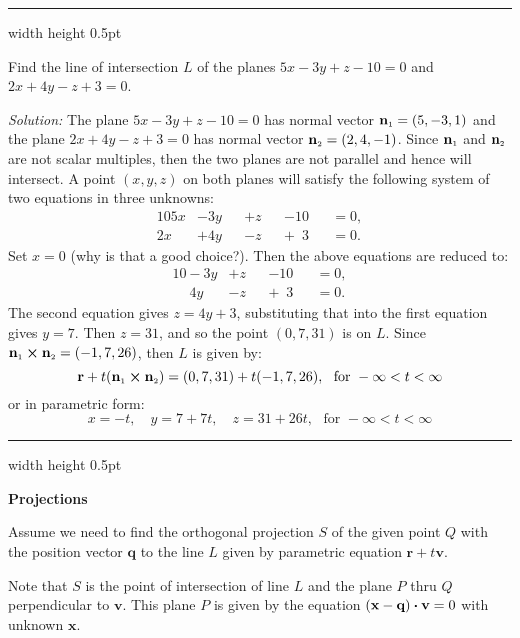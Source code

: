 \medskip
\hrule width \textwidth height 0.5pt
\begin{exmp}\label{exmp:planeinter}
 Find the line of intersection $L$ of the planes $5x - 3y + z - 10 = 0$ and $2x + 4y - z + 3 = 0$.
 \smallskip
 \par\noindent\emph{Solution:} The plane $5x - 3y + z - 10 = 0$ has normal vector $\textbf{n}_{\scriptscriptstyle 1} = (5,-3,1)$ and
 the plane $2x + 4y - z + 3 = 0$ has normal vector $\textbf{n}_{\scriptscriptstyle 2} = (2,4,-1)$. Since $\textbf{n}_{\scriptscriptstyle 1}$ and
 $\textbf{n}_{\scriptscriptstyle 2}$ are not scalar multiples, then the two planes are not parallel and hence will intersect. A
 point $(x,y,z)$ on both planes will satisfy the following system of two equations in three unknowns:
 \begin{alignat*}{10}
  5x &- 3y &&+ z &&- 10 &&= 0,\\
  2x &+ 4y &&- z &&+ \phantom{1}3 &&= 0.
 \end{alignat*}
 Set $x = 0$ (why is that a good choice?). Then the above equations are reduced to:
 \begin{alignat*}{10}
  -3y &+ z &&- 10 &&= 0,\\
  \phantom{-}4y &- z &&+ \phantom{1}3 &&= 0.
 \end{alignat*}
 The second equation gives $z = 4y + 3$, substituting that into the first equation gives $y = 7$. Then $z = 31$,
 and so the point $(0,7,31)$ is on $L$. Since $\textbf{n}_{\scriptscriptstyle 1} \bm{\times} \textbf{n}_{\scriptscriptstyle 2} = (-1,7,26)$,
 then $L$ is given by:
 \begin{displaymath}
  \textbf{r} + t(\textbf{n}_{\scriptscriptstyle 1} \bm{\times} \textbf{n}_{\scriptscriptstyle 2}) = (0,7,31) + t(-1,7,26), \text{~~for~}
  -\infty < t < \infty
 \end{displaymath}
 or in parametric form:
 \begin{displaymath}
  x = -t, \quad y = 7 + 7t, \quad z = 31 +26t, \text{~~for~} -\infty < t < \infty
 \end{displaymath} 
\end{exmp}
\hrule width \textwidth height 0.5pt


\medskip
\par\noindent\textbf{\large{Projections}}\normalsize
\smallskip

Assume we need to find the orthogonal projection $S$ of the given point $Q$ with the position vector $\textbf{q}$ to the line $L$ given by parametric equation $\textbf{r}+t\textbf{v}$.

Note that $S$ is the point of intersection of line $L$ and the plane $P$ thru $Q$ perpendicular to $\textbf{v}$.
This plane $P$ is given by the equation $(\textbf{x}-\textbf{q}) \bm{\cdot} \textbf{v}=0$ with unknown $\textbf{x}$.

